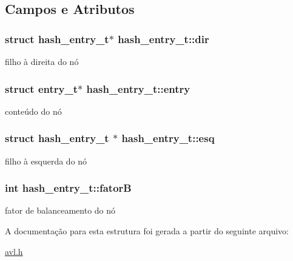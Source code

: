 \subsection{Campos e Atributos}
\hypertarget{structhash__entry__t_aae1502e17b7bf9898325996b0e40259c}{
\subsubsection[{dir}]{\setlength{\rightskip}{0pt plus 5cm}struct {\bf hash\_\-entry\_\-t}$\ast$ {\bf hash\_\-entry\_\-t::dir}}}
\label{structhash__entry__t_aae1502e17b7bf9898325996b0e40259c}
filho à direita do nó \hypertarget{structhash__entry__t_a37f08e45bf32b96b07d7db8550e4df1b}{
\subsubsection[{entry}]{\setlength{\rightskip}{0pt plus 5cm}struct {\bf entry\_\-t}$\ast$ {\bf hash\_\-entry\_\-t::entry}}}
\label{structhash__entry__t_a37f08e45bf32b96b07d7db8550e4df1b}
conteúdo do nó \hypertarget{structhash__entry__t_ac3b05345e41365209c1eb12fee3f5d70}{
\subsubsection[{esq}]{\setlength{\rightskip}{0pt plus 5cm}struct {\bf hash\_\-entry\_\-t} $\ast$ {\bf hash\_\-entry\_\-t::esq}}}
\label{structhash__entry__t_ac3b05345e41365209c1eb12fee3f5d70}
filho à esquerda do nó \hypertarget{structhash__entry__t_a4537a128188ab740031d11b94dbed5d0}{
\subsubsection[{fatorB}]{\setlength{\rightskip}{0pt plus 5cm}int {\bf hash\_\-entry\_\-t::fatorB}}}
\label{structhash__entry__t_a4537a128188ab740031d11b94dbed5d0}
fator de balanceamento do nó 

A documentação para esta estrutura foi gerada a partir do seguinte arquivo:\begin{DoxyCompactItemize}
\item 
\hyperlink{avl_8h}{avl.h}\end{DoxyCompactItemize}

